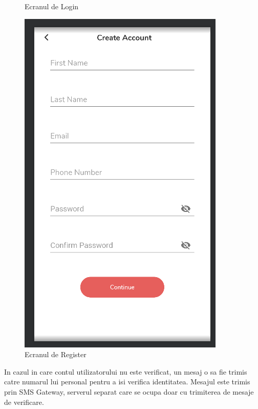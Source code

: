 \documentclass[12pt]{article}
\begin{document}
\begin{figure}[H]
\begin{minipage}[b]{0.4\textwidth}
      \caption{Ecranul de Login}
    \end{minipage}
    \hfill
    \begin{minipage}[b]{0.4\textwidth}
      \includegraphics[width=\textwidth]{register.png}
      \caption{Ecranul de Register}
    \end{minipage}
  \end{figure}

In cazul in care contul utilizatorului nu este verificat, un mesaj o sa fie trimis
catre numarul lui personal pentru a isi verifica identitatea. Mesajul este trimis
prin SMS Gateway, serverul separat care se ocupa doar cu trimiterea de mesaje de verificare.
\end{document}
